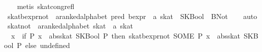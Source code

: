 \begin{isabellebody}
%
\isadelimproof
\ \ %
\endisadelimproof
%
\isatagproof
{}\isamarkupfalse%
\ {}metis\ skat{}cong{}refl{}%
\endisatagproof
{\isafoldproof}%
%
\isadelimproof
\isanewline
%
\endisadelimproof
\isanewline
{}\isamarkupfalse%
\ skat{}bexpr{}not\ {}{}\ {}{}a{}{}ranked{}alphabet\ pred\ bexpr\ {}\ {}a\ skat{}\ \ {}SKBool\ {}\ BNot{}\isanewline
%
\isadelimproof
\ \ %
\endisadelimproof
%
\isatagproof
{}\isamarkupfalse%
\ auto%
\endisatagproof
{\isafoldproof}%
%
\isadelimproof
\isanewline
%
\endisadelimproof
\isanewline
{}\isamarkupfalse%
\ skat{}not\ {}{}\ {}{}a{}{}ranked{}alphabet\ skat\ {}\ {}a\ skat{}\ {}{}{}{}{}\ \isanewline
\ \ {}{}x\ {}\ if\ {}{}P{}\ x\ {}\ abs{}skat\ {}SKBool\ P{}{}\ then\ skat{}bexpr{}not\ {}SOME\ P{}\ x\ {}\ abs{}skat\ {}SKBool\ P{}{}\ else\ undefined{}\isanewline

\end{isabellebody}
